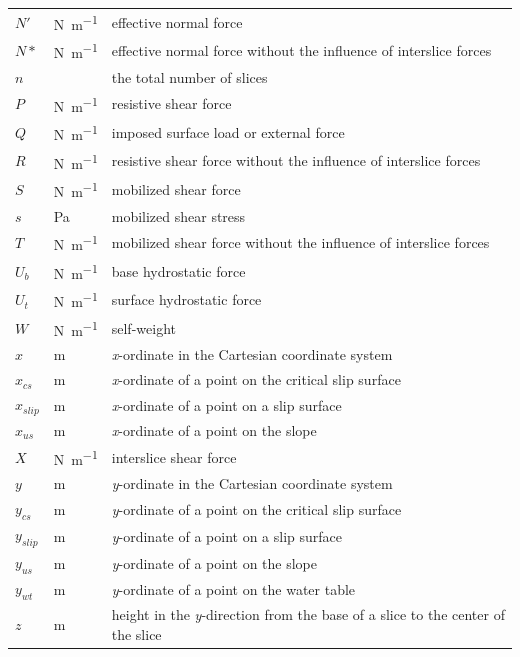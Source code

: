 \documentclass[12pt]{article}
\begin{document}
\begin{longtable*}{  l  l  p{8.5cm}  }
$N'$ &\si{\newton\per\meter} & effective normal force
\\
$N*$ &\si{\newton\per\meter} & effective normal force without the influence of 
interslice forces
\\
$n$ & & the total number of slices
\\
$P$ & \si{\newton\per\meter} & resistive shear force
\\
$Q$ & \si{\newton\per\meter} & imposed surface load or external force
\\
$R$ & \si{\newton\per\meter} & resistive shear force without the influence of 
interslice forces
\\
$S$ & \si{\newton\per\meter} & mobilized shear force
\\
$s$ &\si{\pascal} & mobilized shear stress
\\
$T$ & \si{\newton\per\meter} & mobilized shear force without the influence of 
interslice 
forces
\\
${U_{b}}$ & \si{\newton\per\meter} & base hydrostatic force
\\
${U_{t}}$ & \si{\newton\per\meter} & surface hydrostatic force
\\
$W$ & \si{\newton\per\meter} & self-weight
\\
$x$ & \si{\meter}& \textit{x}-ordinate in the Cartesian coordinate system
\\
$x_{cs}$ & \si{\meter} & \textit{x}-ordinate of a point on the critical slip 
surface
\\
${x_{slip}}$ &  \si{\meter}& \textit{x}-ordinate of a point on a slip surface
\\
${x_{us}}$ &  \si{\meter}& \textit{x}-ordinate of a point on the slope
\\
$X$ & \si{\newton\per\meter} & interslice shear force
\\
$y$ &  \si{\meter}& \textit{y}-ordinate in the Cartesian coordinate system
\\
$y_{cs}$ & \si{\meter} & \textit{y}-ordinate of a point on the critical slip 
surface
\\
${y_{slip}}$ & \si{\meter}& \textit{y}-ordinate of a point on a slip surface
\\
${y_{us}}$ &  \si{\meter}& \textit{y}-ordinate of a point on the slope 
\\
${y_{wt}}$ &  \si{\meter}& \textit{y}-ordinate of a point on the water table
\\
$z$ & \si{\meter}& height in the \textit{y}-direction from the base of a slice 
to the center of the slice
\\

\end{longtable*}
\end{document}
